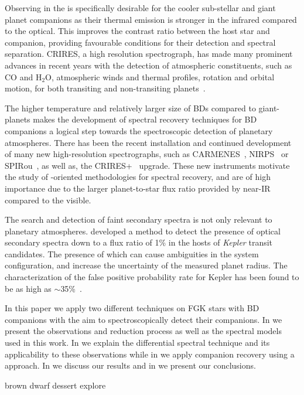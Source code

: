 Observing in the \nir{} is specifically desirable for the cooler sub-stellar and giant planet companions as their thermal emission is stronger in the infrared compared to the optical. This improves the contrast ratio between the host star and companion, providing favourable conditions for their detection and spectral separation.
CRIRES, a high resolution \nir{} spectrograph, has made many prominent advances in recent years with the detection of atmospheric constituents, such as \(\textrm{CO} \) and \(\textrm{H}_{2}\textrm{O} \), atmospheric winds and thermal profiles, rotation and orbital motion, for both transiting and non-transiting planets~\citep[e.g.][]{snellen_orbital_2010, brogi_signature_2012, rodler_weighing_2012, dekok_detection_2013, brogi_carbon_2014, snellen_fast_2014, piskorz_evidence_2016, brogi_rotation_2016, birkby_discovery_2017}.

The higher temperature and relatively larger size of BDs compared to giant-planets makes the development of spectral recovery techniques for BD companions a logical step towards the spectroscopic detection of planetary atmospheres.
There has been the recent installation and continued development of many new high-resolution \nir{} spectrographs, such as {CARMENES}~\citep{quirrenbach_carmenes_2014}, NIRPS~\citep{bouchy_nearinfrared_2017} or SPIRou~\citep{artigau_spirou_2014}, as well as, the {CRIRES+}~\citep{dorn_crires_2016} upgrade.
These new instruments motivate the study of \nir{}-oriented methodologies for spectral recovery, and are of high importance due to the larger planet-to-star flux ratio provided by near-IR compared to the visible.

{\rd{} The search and detection of faint secondary spectra is not only relevant to planetary atmospheres.
\citet{kolbl_detection_2015} developed a method to detect the presence of optical secondary spectra down to a flux ratio of 1\% in the hosts of \emph{Kepler} transit candidates.
The presence of which can cause ambiguities in the system configuration, and increase the uncertainty of the measured planet radius.
The characterization of the false positive probability rate for Kepler has been found to be as high as \(\sim\)35\%~\citet{santerne_sophie_2012}.}

In this paper we apply two different techniques on FGK stars with BD companions with the aim to spectroscopically detect their companions.
In  we present the observations and reduction process as well as the spectral models used in this work.
In  we explain the differential spectral technique and its applicability to these observations while in  we apply companion recovery using a \textchisquared{} approach.
In  we discuss our results and in  we present our conclusions.



brown dwarf dessert explore \citet{ranc_moa2007blg197_2015}


